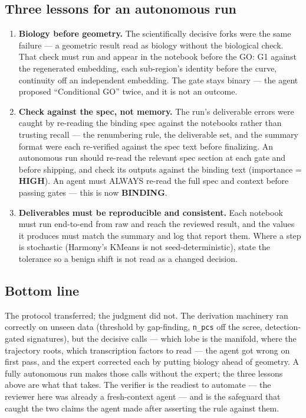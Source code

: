 \documentclass[11pt,a4paper]{article}
\begin{document}
\hypertarget{three-lessons-for-an-autonomous-run}{%
\subsection{Three lessons for an autonomous run}\label{three-lessons-for-an-autonomous-run}}

\begin{enumerate}
\def\labelenumi{\arabic{enumi}.}
\item
  \textbf{Biology before geometry.} The scientifically decisive forks
  were the same failure --- a geometric result read as biology without
  the biological check. That check must run and appear in the notebook
  before the GO: G1 against the regenerated embedding, each sub-region's
  identity before the curve, continuity off an independent embedding.
  The gate stays binary --- the agent proposed ``Conditional GO'' twice,
  and it is not an outcome.
\item
  \textbf{Check against the spec, not memory.} The run's deliverable
  errors were caught by re-reading the binding spec against the
  notebooks rather than trusting recall --- the renumbering rule, the
  deliverable set, and the summary format were each re-verified against
  the spec text before finalizing. An autonomous run should re-read the
  relevant spec section at each gate and before shipping, and check its
  outputs against the binding text (importance = \textbf{HIGH}). An
  agent must ALWAYS re-read the full spec and context before passing gates
  --- this is now \textbf{BINDING}.
\item
  \textbf{Deliverables must be reproducible and consistent.} Each
  notebook must run end-to-end from raw and reach the reviewed result,
  and the values it produces must match the summary and log that report
  them. Where a step is stochastic (Harmony's KMeans is not
  seed-deterministic), state the tolerance so a benign shift is not read
  as a changed decision.
\end{enumerate}

\hypertarget{bottom-line}{%
\subsection{Bottom line}\label{bottom-line}}

The protocol transferred; the judgment did not. The derivation machinery
ran correctly on unseen data (threshold by gap-finding, \texttt{n\_pcs}
off the scree, detection-gated signatures), but the decisive calls ---
which lobe is the manifold, where the trajectory roots, which
transcription factors to read --- the agent got wrong on first pass, and
the expert corrected each by putting biology ahead of geometry. A fully
autonomous run makes those calls without the expert; the three lessons
above are what that takes. The verifier is the readiest to automate ---
the reviewer here was already a fresh-context agent --- and is the
safeguard that caught the two claims the agent made after asserting the
rule against them.
\end{document}
